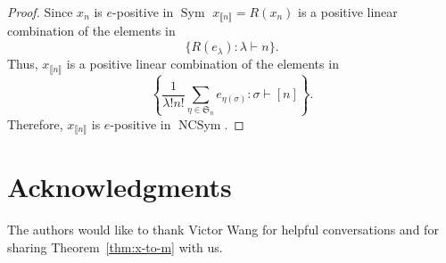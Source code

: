 \documentclass[12pt]{amsart}  %
\theoremstyle{definition}
\theoremstyle{remark}
\numberwithin{equation}{section}
\newcommand{\Sym}{\ensuremath{\operatorname{Sym}}}
\newcommand{\NCSym}{\ensuremath{\operatorname{NCSym}}}
\newcommand{\enc}{{e}}         	%
\newcommand{\stn}{{\llbracket n \rrbracket}}
\newcommand\svw[1]{{\color{black}{#1}}}
\begin{document}
\begin{proof}
 Since $x_n$ is $e$-positive in $\Sym$ \svw{by assumption, we have that}  $x_{\stn}=R(x_n)$ is a positive linear combination of the elements in 
$$\{ R(e_\lambda): \lambda\vdash n\}.$$ Thus, $x_{\stn}$ is a positive linear combination of the elements in  $$\left\{ \frac{1}{\lambda!n!}\sum_{\eta\in \mathfrak{S}_n} e_{\eta(\sigma)}: \sigma\vdash [n] \right\}.$$
Therefore, $x_{\stn}$ is $\enc$-positive in $\NCSym$.
%
\end{proof} 



\section{Acknowledgments}\label{sec:ack}  The authors would like to thank Victor Wang for helpful conversations and for sharing Theorem~\ref{thm:x-to-m} with us.










\end{document}
